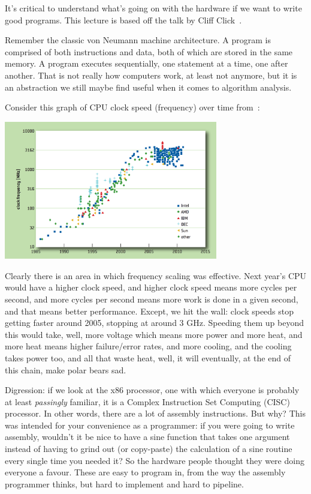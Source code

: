 \documentclass[a4paper]{report}
\begin{document}
It's critical to understand what's going on with the hardware if we want to write good programs. This lecture is based off the talk by Cliff Click~\cite{modern-hardware}.

Remember the classic von Neumann machine architecture. A program is comprised of both instructions and data, both of which are stored in the same memory. A program executes sequentially, one statement at a time, one after another. That is not really how computers work, at least not anymore, but it is an abstraction we still maybe find useful when it comes to algorithm analysis.

Consider this graph of CPU clock speed (frequency) over time from~\cite{cpudb}:

\begin{center}
\includegraphics[width=0.7\textwidth]{images/cpu-frequency}
\end{center}

Clearly there is an area in which frequency scaling was effective. Next year's CPU would have a higher clock speed, and higher clock speed means more cycles per second, and more cycles per second means more work is done in a given second, and that means better performance. Except, we hit the wall: clock speeds stop getting faster around 2005, stopping at around 3 GHz. Speeding them up beyond this would take, well, more voltage which means more power and more heat, and more heat means higher failure/error rates, and more cooling, and the cooling takes power too, and all that waste heat, well, it will eventually, at the end of this chain, make polar bears sad.

Digression: if we look at the x86 processor, one with which everyone is probably at least \textit{passingly} familiar, it is a Complex Instruction Set Computing (CISC) processor. In other words, there are a lot of assembly instructions. But why? This was intended for your convenience as a programmer: if you were going to write assembly, wouldn't it be nice to have a sine function that takes one argument instead of having to grind out (or copy-paste) the calculation of a sine routine every single time you needed it? So the hardware people thought they were doing everyone a favour. These are easy to program in, from the way the assembly programmer thinks, but hard to implement and hard to pipeline. 
\end{document}
